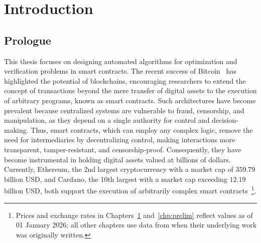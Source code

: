 \chapter{Introduction}
\label{chp:intro}

\section{Prologue}

 This thesis focuses on designing automated algorithms for optimization and verification problems in smart contracts. The recent success of Bitcoin~\cite{nakamoto2008bitcoin} has highlighted the potential of blockchains, encouraging researchers to extend the concept of transactions beyond the mere transfer of digital assets to the execution of arbitrary programs, known as smart contracts. Such architectures have become prevalent because centralized systems are vulnerable to fraud, censorship, and manipulation, as they depend on a single authority for control and decision-making. Thus, smart contracts, which can employ any complex logic, remove the need for intermediaries by decentralizing control, making interactions more transparent, tamper-resistant, and censorship-proof. Consequently, they have become instrumental in holding digital assets valued at billions of dollars. Currently, Ethereum, the 2nd largest cryptocurrency with a market cap of $359.79$ billion USD, and Cardano, the 10th largest with a market cap exceeding $12.19$ billion USD, both support the execution of arbitrarily complex smart contracts~\cite{coinmarketcap2024cryptocurrency}\footnote{Prices and exchange rates in Chapters~\ref{chp:intro} and~\ref{chp:prelim} reflect values as of 01 January 2026; all other chapters use data from when their underlying work was originally written.}.


